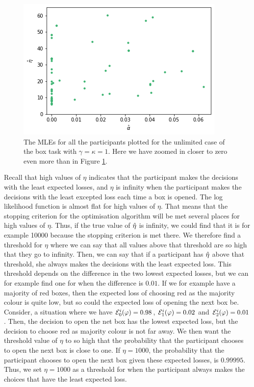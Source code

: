 \begin{figure}
    \centering
    \includegraphics[scale=0.7]{pictures/plotted_mles_unlim_gk1_zoom2.png}
    \caption[MLEs of $\alpha$ and $\eta$, unlimited with $\gamma=\kappa=1$, zoomed more]{The MLEs for all the participants plotted for the unlimited case of the box task with $\gamma=\kappa=1$. Here we have zoomed in closer to zero even more than in Figure \ref{fig:plot_all_mles_unlim_zoom2}.}
    \label{fig:plot_all_mles_unlim_zoom2}
\end{figure}

 

Recall that high values of $\eta$ indicates that the participant makes the decisions with the least expected losses, and $\eta$ is infinity when the participant makes the decisions with the least excepted loss each time a box is opened.  
The log likelihood function is almost flat for high values of $\eta$. That means that the stopping criterion for the optimisation algorithm will be met several places for high values of $\eta$. Thus, if the true value of $\hat{\eta}$ is infinity, we could find that it is for example 10000 because the stopping criterion is met there. We therefore find a threshold for $\eta$ where we can say that all values above that threshold are so high that they go to infinity. Then, we can say that if a participant has $\hat{\eta}$ above that threshold, she always makes the decisions with the least expected loss. This threshold depends on the difference in the two lowest expected losses, but we can for example find one for when the difference is $0.01$.  If we for example have a majority of red boxes, then the expected loss of choosing red as the majority colour is quite low, but so could the expected loss of opening the next box be. Consider, a situation where we have $\mathcal{E}_0^i(\varphi)=0.98$, $\mathcal{E}_1^i(\varphi)=0.02$ and $\mathcal{E}_2^i(\varphi)=0.01$. Then, the decision to open the net box has the lowest expected loss, but the decision to choose red as majority colour is not far away. We then want the threshold value of $\eta$ to so high that the probability that the participant chooses to open the next box is close to one. If $\eta=1000$, the probability that the participant chooses to open the next box given these expected losses, is $0.99995$. Thus, we set $\eta=1000$ as a threshold for when the participant
always makes the choices that have the least expected loss.

